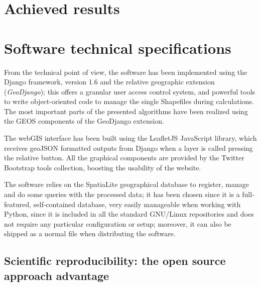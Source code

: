            \vfill

        \section{Achieved results}

        \section{Software technical specifications}
            From the technical point of view, the software has been implemented using the Django framework, version 1.6 and the relative geographic extension (\emph{GeoDjango}); this offers a granular user access control system, and powerful tools to write object-oriented code to manage the single Shapefiles during calculations. The most important parts of the presented algorithms have been realized using the GEOS components of the GeoDjango extension.

            The webGIS interface has been built using the LeafletJS JavaScript library, which receives geoJSON formatted outputs from Django when a layer is called pressing the relative button. All the graphical components are provided by the Twitter Bootstrap tools collection, boosting the usability of the website.
            
            The software relies on the SpatiaLite geographical database to register, manage and do some queries with the processed data; it has been chosen since it is a full-featured, self-contained database, very easily manageable when working with Python, since it is included in all the standard GNU/Linux repositories and does not require any particular configuration or setup; moreover, it can also be shipped as a normal file when distributing the software.

            \subsection{Scientific reproducibility: the open source approach advantage}

